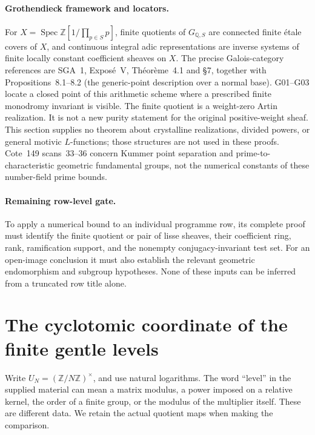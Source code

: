 \documentclass[11pt,a4paper]{article}
\begin{document}
\paragraph{Grothendieck framework and locators.}
For $X=\operatorname{Spec}\mathbb Z[1/\prod_{p\in S}p]$, finite quotients of $G_{\mathbb Q,S}$ are connected finite \'etale covers of $X$, and continuous integral adic representations are inverse systems of finite locally constant coefficient sheaves on $X$. The precise Galois-category references are SGA~1, Expos\'e~V, Th\'eor\`eme~4.1 and \S7, together with Propositions~8.1--8.2 (the generic-point description over a normal base). G01--G03 locate a closed point of this arithmetic scheme where a prescribed finite monodromy invariant is visible.  The finite quotient is a weight-zero Artin realization.  It is not a new purity statement for the original positive-weight sheaf.  This section supplies no theorem about crystalline realizations, divided powers, or general motivic $L$-functions; those structures are not used in these proofs.  Cote~149 scans~33--36 concern Kummer point separation and prime-to-characteristic geometric fundamental groups, not the numerical constants of these number-field prime bounds.

\paragraph{Remaining row-level gate.}
To apply a numerical bound to an individual programme row, its complete proof must identify the finite quotient or pair of lisse sheaves, their coefficient ring, rank, ramification support, and the nonempty conjugacy-invariant test set. For an open-image conclusion it must also establish the relevant geometric endomorphism and subgroup hypotheses. None of these inputs can be inferred from a truncated row title alone.


\section{The cyclotomic coordinate of the finite gentle levels}
\label{sec:gt-certificates}

Write $U_N=(\mathbb Z/N\mathbb Z)^\times$, and use natural logarithms.
The word ``level'' in the supplied material can mean a matrix modulus,
a power imposed on a relative kernel, the order of a finite group, or
the modulus of the multiplier itself. These are different data. We
retain the actual quotient maps when making the comparison.
\end{document}
